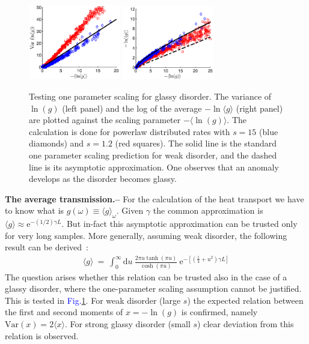 \documentclass[twocolumn,showpacs,aps,pre]{revtex4-1}
\newcommand{\eexp}[1]{\mathrm{e}^{#1}}
\newcommand{\be}[1]{\begin{eqnarray} \label{e#1}}
\newcommand{\eeq}{\end{eqnarray}}
\newcommand{\Fig}[1] {{\textcolor{blue}{Fig.}}\ref{#1}}
\newcommand{\sect}[1]{{\bf #1.-- }}
\begin{document}

\begin{figure}

\includegraphics[clip,width=4cm]{varVSavg}
\includegraphics[clip,width=4cm]{avgVSavg}



\caption{ \footnotesize 
Testing one parameter scaling for glassy disorder. 
The variance of $\ln(g)$ (left panel) and the log of the average $-\ln\langle g \rangle$ (right panel)
are plotted against the scaling parameter $-\langle \ln(g) \rangle$. 
The calculation is done for powerlaw distributed rates 
with ${s=15}$ (blue diamonds) and ${s=1.2}$ (red squares).
The solid line is the standard one parameter scaling prediction for weak disorder, 
and the dashed line is its asymptotic approximation. 
One observes that an anomaly develops as the disorder becomes glassy.}

\label{f3}
\end{figure}



\sect{The average transmission}
%
For the calculation of the heat transport we have to know 
what is  ${ g(\omega) \equiv \langle g \rangle_{\omega} }$. 
Given $\gamma$ the common approximation 
is ${ \langle g \rangle \approx \eexp{-(1/2)\gamma L}}$.
But in-fact this asymptotic approximation can be trusted 
only for very long samples. More generally, assuming weak disorder, 
the following result can be derived~\cite{Abrikosov,Shapiro,Izrailev}:
%
\be{14}
\langle g \rangle \ = \ 
\int_0^\infty\mathrm{d} u
\ \frac{2\pi u\tanh(\pi u)}{\cosh(\pi u)}
\ \mathrm{e}^{-\left[\left(\frac{1}{4}+u^2\right)\gamma L\right]}
\label{gabrik}
\eeq
%
The question arises whether this relation can be trusted 
also in the case of a glassy disorder, where the 
one-parameter scaling assumption cannot be justified.
%
This is tested in \Fig{f3}. For weak disorder (large $s$) 
the expected relation between the first and second moments 
of $x=-\ln(g)$ is confirmed, namely ${\text{Var}(x)=2\langle x \rangle}$.
For strong glassy disorder (small $s$) clear deviation 
from this relation is observed. 
\end{document}
